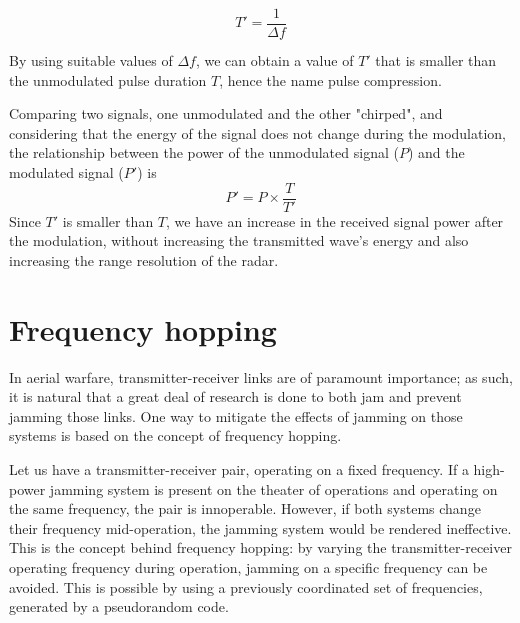 \documentclass[english,purist]{ist-report}
\begin{document}
$$
T' = \frac{1}{\Delta f}
$$

By using suitable values of $\Delta f$, we can obtain a value of $T'$ that is smaller than the unmodulated pulse duration $T$, hence the name pulse compression.

Comparing two signals, one unmodulated and the other "chirped", and considering that the energy of the signal does not change during the modulation, the relationship between the power of the unmodulated signal ($P$) and the modulated signal ($P'$) is
$$
P' = P \times \frac{T}{T'}
$$
Since $T'$ is smaller than $T$, we have an increase in the received signal power after the modulation, without increasing the transmitted wave's energy and also increasing the range resolution of the radar.



\section{Frequency hopping}

In aerial warfare, transmitter-receiver links are of paramount importance; as such, it is natural that a great deal of research is done to both jam and prevent jamming those links. One way to mitigate the effects of jamming on those systems is based on the concept of frequency hopping.

Let us have a transmitter-receiver pair, operating on a fixed frequency. If a high-power jamming system is present on the theater of operations and operating on the same frequency, the pair is innoperable. However, if both systems change their frequency mid-operation, the jamming system would be rendered ineffective. This is the concept behind frequency hopping: by varying the transmitter-receiver operating frequency during operation, jamming on a specific frequency can be avoided. This is possible by using a previously coordinated set of frequencies, generated by a pseudorandom code.
\end{document}
